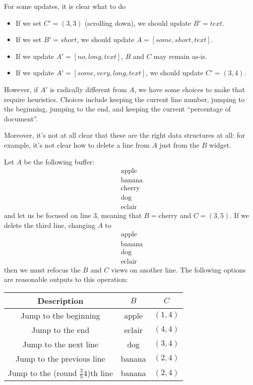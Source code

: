 \documentclass{article}
\begin{document}
For some updates, it is clear what to do
\begin{itemize}
    \item If we set $C'=(3,3)$ (scrolling down), we should update $B' =
        text$.
    \item If we set $B'=short$, we should update $A=[some,short,text]$.
    \item If we update $A'=[no,long,text]$, $B$ and $C$ may remain as-is.
    \item If we update $A'=[some,very,long,text]$, we should update
        $C'=(3,4)$.
\end{itemize}

However, if $A'$ is radically different from $A$, we have some choices to
make that require heuristics. Choices include keeping the current line
number, jumping to the beginning, jumping to the end, and keeping the current ``percentage of document''.

Moreover, it's not at all clear that these are the right data structures at
all: for example, it's not clear how to delete a line from $A$ just from the
$B$ widget.

Let $A$ be the following buffer:
\begin{align*}
  &\text{apple} \\
  &\text{banana} \\
  &\text{cherry} \\
  &\text{dog} \\
  &\text{eclair}
\end{align*}
and let us be focused on line 3, meaning that $B = \text{cherry}$ and $C = (3,5)$.
If we delete the third line, changing $A$ to
\begin{align*}
  &\text{apple} \\
  &\text{banana} \\
  &\text{dog} \\
  &\text{eclair}
\end{align*}
then we must refocus the $B$ and $C$ views on another line. 
The following options are reasonable outputs to this operation:
\begin{center}\begin{tabular}{c c c}
  Description & $B$ & $C$ \\
  \hline
  Jump to the beginning & apple & $(1,4)$ \\
  Jump to the end & eclair & $(4,4)$ \\
  Jump to the next line & dog & $(3,4)$ \\
  Jump to the previous line & banana & $(2,4)$ \\
  Jump to the (round $\frac 3 5 4$)th line & banana & $(2,4)$
\end{tabular}\end{center}
\end{document}
